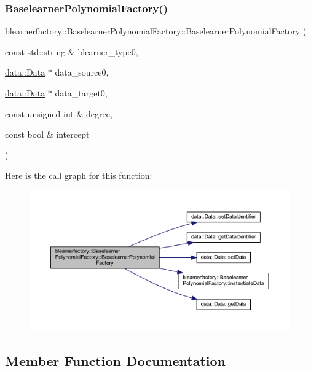 \subsubsection{\texorpdfstring{Baselearner\+Polynomial\+Factory()}{BaselearnerPolynomialFactory()}}
{\footnotesize\ttfamily blearnerfactory\+::\+Baselearner\+Polynomial\+Factory\+::\+Baselearner\+Polynomial\+Factory (\begin{DoxyParamCaption}\item[{const std\+::string \&}]{blearner\+\_\+type0,  }\item[{\mbox{\hyperlink{classdata_1_1_data}{data\+::\+Data}} $\ast$}]{data\+\_\+source0,  }\item[{\mbox{\hyperlink{classdata_1_1_data}{data\+::\+Data}} $\ast$}]{data\+\_\+target0,  }\item[{const unsigned int \&}]{degree,  }\item[{const bool \&}]{intercept }\end{DoxyParamCaption})}

Here is the call graph for this function\+:\nopagebreak
\begin{figure}[H]
\begin{center}
\leavevmode
\includegraphics[width=350pt]{classblearnerfactory_1_1_baselearner_polynomial_factory_aaa0dbb3dab4a98dfb1835998fc3ffa50_cgraph}
\end{center}
\end{figure}


\subsection{Member Function Documentation}
\mbox{\label{classblearnerfactory_1_1_baselearner_polynomial_factory_a18095806fa93e6ac2159e966ededc1cf}} 
